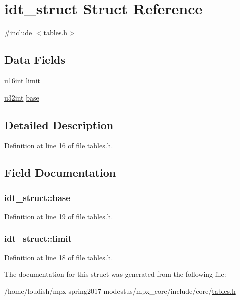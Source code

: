 \hypertarget{structidt__struct}{}\section{idt\+\_\+struct Struct Reference}
\label{structidt__struct}


{\ttfamily \#include $<$tables.\+h$>$}

\subsection*{Data Fields}
\begin{DoxyCompactItemize}
\item 
\hyperlink{system_8h_a863d9497073aad2b991aeab2211d87af}{u16int} \hyperlink{structidt__struct_aa75e2805e21db1a33816af778263d712}{limit}
\item 
\hyperlink{system_8h_a757de76cafbcddaac0d1632902fe4cb8}{u32int} \hyperlink{structidt__struct_a1a91fe2ab44ad8dfbad0f6d07ec789ea}{base}
\end{DoxyCompactItemize}


\subsection{Detailed Description}


Definition at line 16 of file tables.\+h.



\subsection{Field Documentation}
\subsubsection[{\texorpdfstring{base}{base}}]{ idt\+\_\+struct\+::base}\hypertarget{structidt__struct_a1a91fe2ab44ad8dfbad0f6d07ec789ea}{}\label{structidt__struct_a1a91fe2ab44ad8dfbad0f6d07ec789ea}


Definition at line 19 of file tables.\+h.

\subsubsection[{\texorpdfstring{limit}{limit}}]{ idt\+\_\+struct\+::limit}\hypertarget{structidt__struct_aa75e2805e21db1a33816af778263d712}{}\label{structidt__struct_aa75e2805e21db1a33816af778263d712}


Definition at line 18 of file tables.\+h.



The documentation for this struct was generated from the following file\+:\begin{DoxyCompactItemize}
\item 
/home/loudish/mpx-\/spring2017-\/modestus/mpx\+\_\+core/include/core/\hyperlink{tables_8h}{tables.\+h}\end{DoxyCompactItemize}
